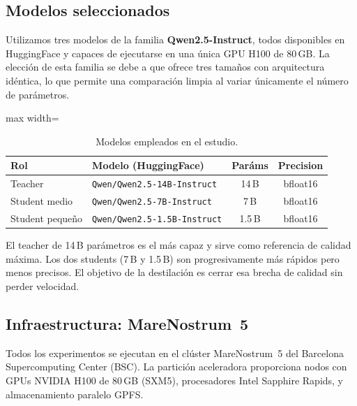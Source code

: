 \documentclass[11pt,a4paper]{article}
\begin{document}
\subsection{Modelos seleccionados}

Utilizamos tres modelos de la familia \textbf{Qwen2.5-Instruct}, todos
disponibles en HuggingFace y capaces de ejecutarse en una \'unica GPU
H100 de 80\,GB. La elecci\'on de esta familia se debe a que ofrece tres
tama\~nos con arquitectura id\'entica, lo que permite una comparaci\'on
limpia al variar \'unicamente el n\'umero de par\'ametros.

\begin{table}[H]
\centering
\caption{Modelos empleados en el estudio.}
\label{tab:models}
\begin{adjustbox}{max width=\textwidth}
\begin{tabular}{@{}llcc@{}}
\toprule
\textbf{Rol} & \textbf{Modelo (HuggingFace)} & \textbf{Par\'ams} & \textbf{Precision} \\
\midrule
Teacher         & \texttt{Qwen/Qwen2.5-14B-Instruct}  & 14\,B & bfloat16 \\
Student medio   & \texttt{Qwen/Qwen2.5-7B-Instruct}   & 7\,B  & bfloat16 \\
Student peque\~no & \texttt{Qwen/Qwen2.5-1.5B-Instruct} & 1.5\,B & bfloat16 \\
\bottomrule
\end{tabular}
\end{adjustbox}
\end{table}

El teacher de 14\,B par\'ametros es el m\'as capaz y sirve como
referencia de calidad m\'axima. Los dos students (7\,B y 1.5\,B) son
progresivamente m\'as r\'apidos pero menos precisos. El objetivo de la
destilaci\'on es cerrar esa brecha de calidad sin perder velocidad.

\subsection{Infraestructura: MareNostrum~5}

Todos los experimentos se ejecutan en el cl\'uster MareNostrum~5 del
Barcelona Supercomputing Center (BSC). La partici\'on aceleradora
proporciona nodos con GPUs NVIDIA H100 de 80\,GB (SXM5), procesadores
Intel Sapphire Rapids, y almacenamiento paralelo GPFS.
\end{document}
